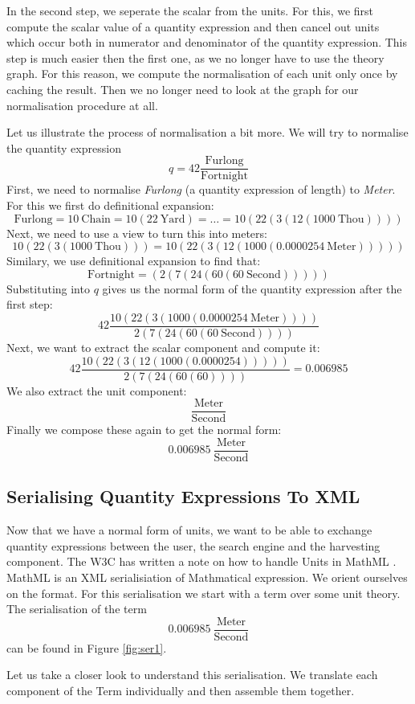 In the second step, we seperate the scalar from the units. For this, we first compute the scalar value of a quantity expression and then cancel out units which occur both in numerator and denominator of the quantity expression. This step is much easier then the first one, as we no longer have to use the theory graph. For this reason, we compute the normalisation of each unit only once by caching the result. Then we no longer need to look at the graph for our normalisation procedure at all.

Let us illustrate the process of normalisation a bit more. We will try to normalise the quantity expression
\[q = 42 \frac{\text{Furlong}}{\text{Fortnight}}\]
First, we need to normalise \textit{Furlong} (a quantity expression of length) to \textit{Meter}. For this we first do definitional expansion:
\[\text{Furlong} = 10\ \text{Chain} = 10 \left( 22\ \text{Yard}\right) = \dots = 10 \left( 22 \left( 3 \left( 12 \left( 1000\ \text{Thou} \right) \right) \right)\right) \]
Next, we need to use a view to turn this into meters:
\[10 \left( 22 \left( 3 \left( 1000\ \text{Thou} \right) \right)\right) = 10 \left( 22 \left( 3 \left( 12 \left( 1000 \left( 0.0000254\ \text{Meter} \right) \right) \right) \right)\right)\]
Similary, we use definitional expansion to find that:
\[\text{Fortnight} = \left( 2 \left( 7 \left( 24 \left( 60 \left( 60\ \text{Second} \right) \right) \right) \right) \right) \]
Substituting into $q$ gives us the normal form of the quantity expression after the first step:
\[42 \frac{10 \left( 22 \left( 3 \left( 1000 \left( 0.0000254\ \text{Meter} \right) \right) \right)\right)}{ 2 \left( 7 \left( 24 \left( 60 \left( 60\ \text{Second} \right) \right) \right) \right)}\]
Next, we want to extract the scalar component and compute it:
\[42 \frac{10 \left( 22 \left( 3 \left( 12 \left( 1000 \left( 0.0000254 \right) \right) \right) \right)\right)}{ 2 \left( 7 \left( 24 \left( 60 \left( 60\right) \right) \right) \right)} = 0.006985 \]
We also extract the unit component:
\[\frac{\text{Meter}}{\text{Second}}\]
Finally we compose these again to get the normal form:
\[0.006985\ \frac{\text{Meter}}{\text{Second}}\]

\subsection{Serialising Quantity Expressions To XML}

Now that we have a normal form of units, we want to be able to exchange quantity expressions between the user, the search engine and the harvesting component. The W3C has written a note on how to handle Units in MathML \cite{W3C:Unitnnote}. MathML is an XML serialisiation of Mathmatical expression. We orient ourselves on the format. For this serialisation we start with a term over some unit theory. The serialisation of the term
\[0.006985\ \frac{\text{Meter}}{\text{Second}}\]
can be found in Figure \ref{fig:ser1}.

Let us take a closer look to understand this serialisation. We translate each component of the Term individually and then assemble them together.


